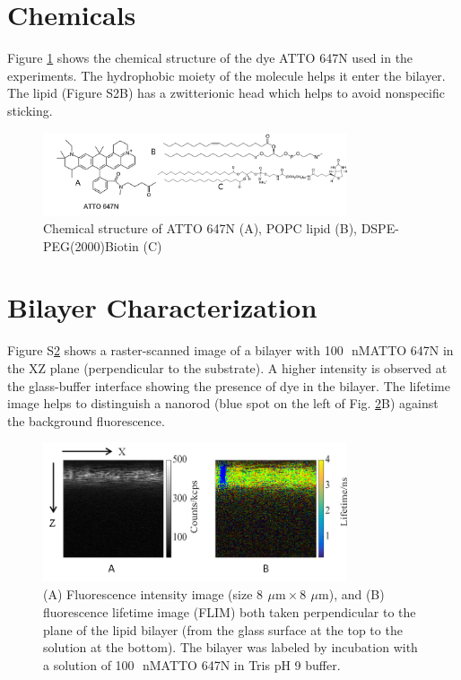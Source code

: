 \documentclass[11pt,a4paper,onecolumn]{article}
\newcommand{\um}{\ensuremath{\,\mu\textrm{m}}}
\newcommand{\nM}{\ensuremath{\,\textrm{nM}}}
\begin{document}
\section{Chemicals}
Figure \ref{SIfig:chemical} shows the chemical structure of the dye ATTO 647N used in the experiments. The
hydrophobic moiety of the molecule helps it enter the bilayer. The lipid (Figure S2B) has a
zwitterionic head which helps to avoid nonspecific sticking.
\begin{figure}[ht]
  \centering
  \includegraphics[width=0.8\textwidth]{chemical_picture.png}
  \makeatletter
  \renewcommand{\fnum@figure}{\figurename~S\thefigure}
  \makeatother{}
  \caption{Chemical structure of ATTO 647N (A), POPC lipid (B), DSPE-PEG(2000)Biotin (C)}
  \label{SIfig:chemical}
\end{figure}
\section{Bilayer Characterization}
Figure S\ref{SIfig:xz-scan} shows a raster-scanned image of a bilayer with 100~\nM ATTO 647N in the XZ plane
(perpendicular to the substrate). A higher intensity is observed at the glass-buffer interface
showing the presence of dye in the bilayer. The lifetime image helps to distinguish a nanorod
(blue spot on the left of Fig. \ref{SIfig:xz-scan}B) against the background fluorescence.
\begin{figure}[ht]
  \centering
  \includegraphics[width=0.8\textwidth]{xz_scan.png}
  \makeatletter
  \renewcommand{\fnum@figure}{\figurename~S\thefigure}
  \makeatother{}
  \caption{(A) Fluorescence intensity image (size $8~\um\times8~\um$), and (B) fluorescence lifetime image (FLIM) 
  both taken perpendicular to the plane of the lipid bilayer (from the glass surface at the top to the solution at 
  the bottom). The bilayer was labeled by incubation with a solution of 100~\nM ATTO 647N in Tris pH 9 buffer.}
  \label{SIfig:xz-scan}
\end{figure}
\end{document}
